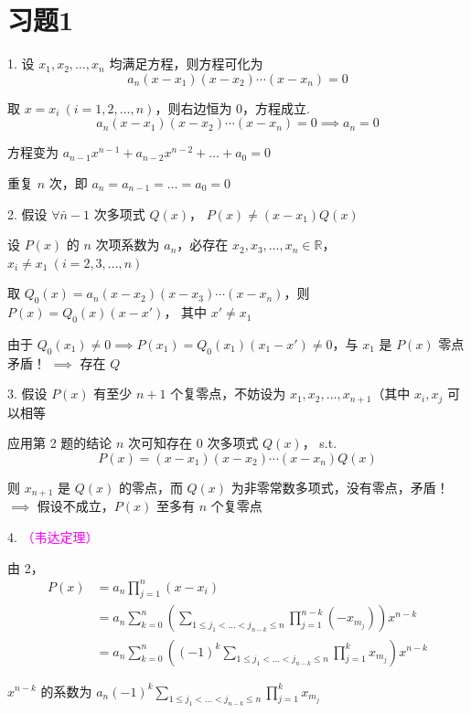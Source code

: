 \section*{习题1}

1. 
设 $x_1, x_2, \dots, x_n$ 均满足方程，则方程可化为
$$a_n(x-x_1)(x-x_2)\cdots(x-x_n) = 0$$

取 $x = x_i \ (i=1,2,\dots,n)$，则右边恒为 0，方程成立.
$$a_n(x-x_1)(x-x_2)\cdots(x-x_n) = 0 \implies a_n = 0$$

方程变为 $a_{n-1}x^{n-1} + a_{n-2}x^{n-2} + \dots + a_0 = 0$

重复 $n$ 次，即 $a_n = a_{n-1} = \dots = a_0 = 0$

\sepline

2.
假设 $\forall \bar n-1$ 次多项式 $Q(x)$， $P(x) \neq (x-x_1)Q(x)$

设 $P(x)$ 的 $n$ 次项系数为 $a_n$，必存在 $x_2, x_3, \dots, x_n \in \mathbb{R}$， $x_i \neq x_1 \ (i=2,3,\dots,n)$

取 $Q_0(x) = a_n(x-x_2)(x-x_3)\cdots(x-x_n)$，则 $P(x) = Q_0(x)(x-x')$， 其中 $x' \neq x_1$ 

由于 $Q_0(x_1) \neq 0 \implies P(x_1) = Q_0(x_1)(x_1-x') \neq 0$，与 $x_1$ 是 $P(x)$ 零点矛盾！ $\implies$ 存在 $Q$

\sepline

3.
假设 $P(x)$ 有至少 $n+1$ 个复零点，不妨设为 $x_1, x_2, \dots, x_{n+1}$（其中 $x_i, x_j$ 可以相等

应用第 2 题的结论 $n$ 次可知存在 0 次多项式 $Q(x)$， s.t.
$$P(x) = (x-x_1)(x-x_2)\cdots(x-x_n)Q(x)$$

则 $x_{n+1}$ 是 $Q(x)$ 的零点，而 $Q(x)$ 为非零常数多项式，没有零点，矛盾！$\implies$ 假设不成立，$P(x)$ 至多有 $n$ 个复零点

\sepline

4.
\textcolor{magenta}{（韦达定理）}

由 2，
\begin{align*}
    P(x) &= a_n \prod_{j=1}^n (x-x_i)\\
    &= a_n \sum_{k=0}^n \left( \sum_{1 \le j_1 < \dots < j_{n-k} \le n} \prod_{j=1}^{n-k} (-x_{m_j}) \right) x^{n-k} \\
    &= a_n \sum_{k=0}^n \left( (-1)^{k} \sum_{1 \le j_1 < \dots < j_{n-k} \le n} \prod_{j=1}^{k} x_{m_j} \right) x^{n-k}
\end{align*}

$x^{n-k}$ 的系数为 $a_n (-1)^{k} \sum_{1 \le j_1 < \dots < j_{n-k} \le n} \prod_{j=1}^{k} x_{m_j}$


